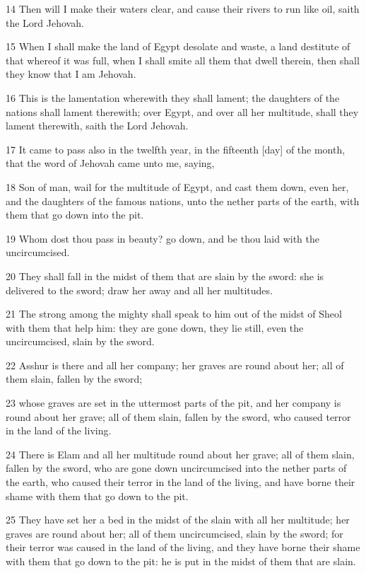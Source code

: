 \par 14 Then will I make their waters clear, and cause their rivers to run like oil, saith the Lord Jehovah.
\par 15 When I shall make the land of Egypt desolate and waste, a land destitute of that whereof it was full, when I shall smite all them that dwell therein, then shall they know that I am Jehovah.
\par 16 This is the lamentation wherewith they shall lament; the daughters of the nations shall lament therewith; over Egypt, and over all her multitude, shall they lament therewith, saith the Lord Jehovah.
\par 17 It came to pass also in the twelfth year, in the fifteenth [day] of the month, that the word of Jehovah came unto me, saying,
\par 18 Son of man, wail for the multitude of Egypt, and cast them down, even her, and the daughters of the famous nations, unto the nether parts of the earth, with them that go down into the pit.
\par 19 Whom dost thou pass in beauty? go down, and be thou laid with the uncircumcised.
\par 20 They shall fall in the midst of them that are slain by the sword: she is delivered to the sword; draw her away and all her multitudes.
\par 21 The strong among the mighty shall speak to him out of the midst of Sheol with them that help him: they are gone down, they lie still, even the uncircumcised, slain by the sword.
\par 22 Asshur is there and all her company; her graves are round about her; all of them slain, fallen by the sword;
\par 23 whose graves are set in the uttermost parts of the pit, and her company is round about her grave; all of them slain, fallen by the sword, who caused terror in the land of the living.
\par 24 There is Elam and all her multitude round about her grave; all of them slain, fallen by the sword, who are gone down uncircumcised into the nether parts of the earth, who caused their terror in the land of the living, and have borne their shame with them that go down to the pit.
\par 25 They have set her a bed in the midst of the slain with all her multitude; her graves are round about her; all of them uncircumcised, slain by the sword; for their terror was caused in the land of the living, and they have borne their shame with them that go down to the pit: he is put in the midst of them that are slain.
